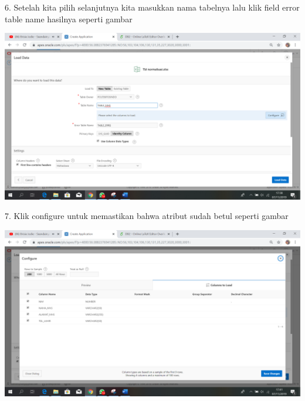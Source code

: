 \documentclass{article}
\begin{document}
\item 6. Setelah kita pilih selanjutnya kita masukkan nama tabelnya lalu klik ﬁeld error table name hasilnya seperti gambar 
\begin{center}
    \includegraphics[width=15cm]{figure/isidata1.png}
\end{center}

\item 7. Klik conﬁgure untuk memastikan bahwa atribut sudah betul seperti gambar\\
\begin{center}
    \includegraphics[width=15cm\textwidth]{figure/configure2.png}
\end{center}
\end{document}
